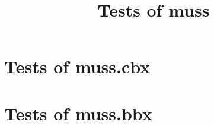 \documentclass[a4paper,11pt]{article}
\title{Tests of muss}
\begin{document}
\maketitle

\section{Tests of muss.cbx}



\newpage

\section{Tests of muss.bbx}



\newpage
 
\printbibliography 
\end{document}
